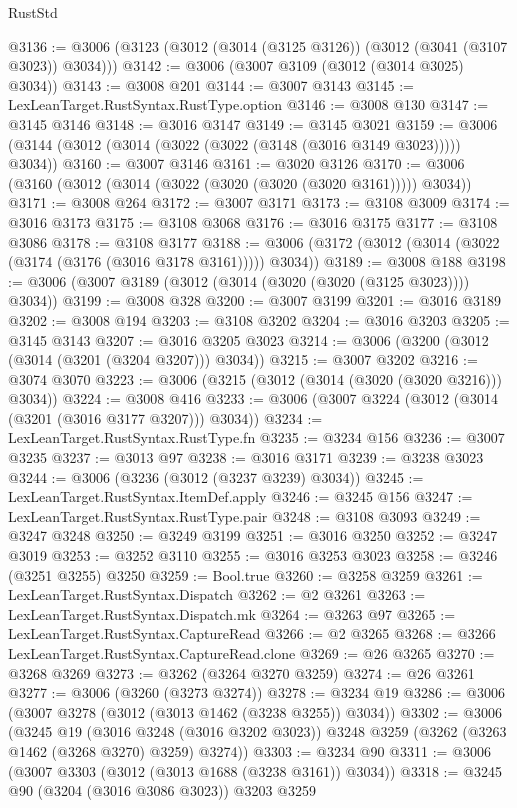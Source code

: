 \begin{lexlean}{RustStd}
\begin{coremodule}
@3136 := @3006 (@3123 (@3012 (@3014 (@3125 @3126)) (@3012 (@3041 (@3107 @3023)) @3034)))
@3142 := @3006 (@3007 @3109 (@3012 (@3014 @3025) @3034))
@3143 := @3008 @201
@3144 := @3007 @3143
@3145 := LexLeanTarget.RustSyntax.RustType.option
@3146 := @3008 @130
@3147 := @3145 @3146
@3148 := @3016 @3147
@3149 := @3145 @3021
@3159 := @3006 (@3144 (@3012 (@3014 (@3022 (@3022 (@3148 (@3016 @3149 @3023))))) @3034))
@3160 := @3007 @3146
@3161 := @3020 @3126
@3170 := @3006 (@3160 (@3012 (@3014 (@3022 (@3020 (@3020 (@3020 @3161))))) @3034))
@3171 := @3008 @264
@3172 := @3007 @3171
@3173 := @3108 @3009
@3174 := @3016 @3173
@3175 := @3108 @3068
@3176 := @3016 @3175
@3177 := @3108 @3086
@3178 := @3108 @3177
@3188 := @3006 (@3172 (@3012 (@3014 (@3022 (@3174 (@3176 (@3016 @3178 @3161))))) @3034))
@3189 := @3008 @188
@3198 := @3006 (@3007 @3189 (@3012 (@3014 (@3020 (@3020 (@3125 @3023)))) @3034))
@3199 := @3008 @328
@3200 := @3007 @3199
@3201 := @3016 @3189
@3202 := @3008 @194
@3203 := @3108 @3202
@3204 := @3016 @3203
@3205 := @3145 @3143
@3207 := @3016 @3205 @3023
@3214 := @3006 (@3200 (@3012 (@3014 (@3201 (@3204 @3207))) @3034))
@3215 := @3007 @3202
@3216 := @3074 @3070
@3223 := @3006 (@3215 (@3012 (@3014 (@3020 (@3020 @3216))) @3034))
@3224 := @3008 @416
@3233 := @3006 (@3007 @3224 (@3012 (@3014 (@3201 (@3016 @3177 @3207))) @3034))
@3234 := LexLeanTarget.RustSyntax.RustType.fn
@3235 := @3234 @156
@3236 := @3007 @3235
@3237 := @3013 @97
@3238 := @3016 @3171
@3239 := @3238 @3023
@3244 := @3006 (@3236 (@3012 (@3237 @3239) @3034))
@3245 := LexLeanTarget.RustSyntax.ItemDef.apply
@3246 := @3245 @156
@3247 := LexLeanTarget.RustSyntax.RustType.pair
@3248 := @3108 @3093
@3249 := @3247 @3248
@3250 := @3249 @3199
@3251 := @3016 @3250
@3252 := @3247 @3019
@3253 := @3252 @3110
@3255 := @3016 @3253 @3023
@3258 := @3246 (@3251 @3255) @3250
@3259 := Bool.true
@3260 := @3258 @3259
@3261 := LexLeanTarget.RustSyntax.Dispatch
@3262 := @2 @3261
@3263 := LexLeanTarget.RustSyntax.Dispatch.mk
@3264 := @3263 @97
@3265 := LexLeanTarget.RustSyntax.CaptureRead
@3266 := @2 @3265
@3268 := @3266 LexLeanTarget.RustSyntax.CaptureRead.clone
@3269 := @26 @3265
@3270 := @3268 @3269
@3273 := @3262 (@3264 @3270 @3259)
@3274 := @26 @3261
@3277 := @3006 (@3260 (@3273 @3274))
@3278 := @3234 @19
@3286 := @3006 (@3007 @3278 (@3012 (@3013 @1462 (@3238 @3255)) @3034))
@3302 := @3006
    (@3245
      @19
      (@3016 @3248 (@3016 @3202 @3023))
      @3248
      @3259
      (@3262 (@3263 @1462 (@3268 @3270) @3259) @3274))
@3303 := @3234 @90
@3311 := @3006 (@3007 @3303 (@3012 (@3013 @1688 (@3238 @3161)) @3034))
@3318 := @3245 @90 (@3204 (@3016 @3086 @3023)) @3203 @3259

\end{coremodule}
\end{lexlean}
